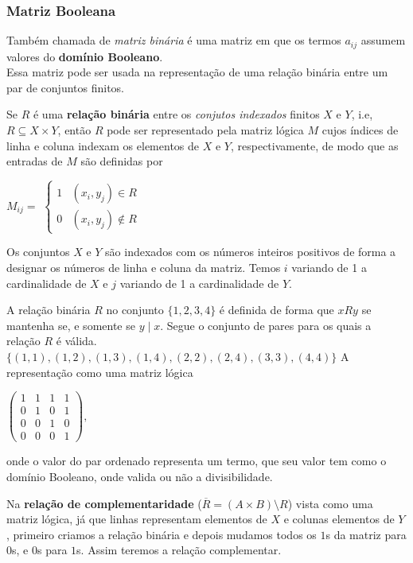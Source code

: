       \subsubsection*{Matriz Booleana}
         Também chamada de \emph{matriz binária} é uma matriz em que os termos $a_{ij}$ assumem valores do \textbf{domínio Booleano}.\\
         Essa matriz pode ser usada na representação de uma relação binária entre um par de conjuntos finitos.
         \begin{definition}
            Se $R$ é uma \textbf{relação binária} entre os \emph{conjutos indexados} finitos $X$ e $Y$, i.e, $R \subseteq X \times Y$, então $R$ pode ser representado pela matriz lógica $M$ cujos índices de linha e coluna indexam os elementos de $X$ e $Y$, respectivamente, de modo que as entradas de $M$ são definidas por
            \begin{center}
               $M_{ij} = $
               $\begin{cases}
                  1 & (x_{i}, y_{j}) \in R \\ 
                  0 & (x_{i}, y_{j}) \notin R
               \end{cases}$
            \end{center}
            Os conjuntos $X$ e $Y$ são indexados com os números inteiros positivos de forma a designar os números de linha e coluna da matriz. Temos $i$ variando de 1 a cardinalidade de $X$ e $j$ variando de 1 a cardinalidade de $Y$.
         \end{definition}
         \begin{exmp}
            A relação binária $R$ no conjunto $\{1,2,3,4\}$ é definida de forma que $xRy$ se mantenha se, e somente se $y \mid x$. Segue o conjunto de pares para os quais a relação $R$ é válida.
            $\{(1,1),(1,2),(1,3),(1,4),(2,2),(2,4),(3,3),(4,4)\}$
            A representação como uma matriz lógica
            \begin{center}
               $\begin{pmatrix}
                  1 & 1 & 1 & 1 \\
                  0 & 1 & 0 & 1 \\
                  0 & 0 & 1 & 0 \\
                  0 & 0 & 0 & 1
               \end{pmatrix},$ 
            \end{center}
            onde o valor do par ordenado representa um termo, que seu valor tem como o domínio Booleano, onde valida ou não a divisibilidade.
         \end{exmp}
         Na \textbf{relação de complementaridade} ($\overline{R} = (A \times B) \setminus R$) vista como uma matriz lógica, já que linhas representam elementos de $X$ e colunas elementos de $Y$, primeiro criamos a relação binária e depois mudamos todos os $1$s da matriz para $0$s, e $0$s para $1$s. Assim teremos a relação complementar.